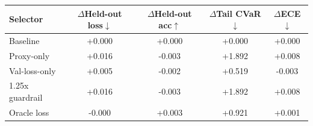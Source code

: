 \begin{tabular}{lcccc}
  \toprule
  Selector & $\Delta$Held-out loss$\downarrow$ & $\Delta$Held-out acc$\uparrow$ & $\Delta$Tail CVaR$\downarrow$ & $\Delta$ECE$\downarrow$ \\
  \midrule
  Baseline & +0.000 & +0.000 & +0.000 & +0.000 \\
  Proxy-only & +0.016 & -0.003 & +1.892 & +0.008 \\
  Val-loss-only & +0.005 & -0.002 & +0.519 & -0.003 \\
  1.25x guardrail & +0.016 & -0.003 & +1.892 & +0.008 \\
  Oracle loss & -0.000 & +0.003 & +0.921 & +0.001 \\
  \bottomrule
\end{tabular}
